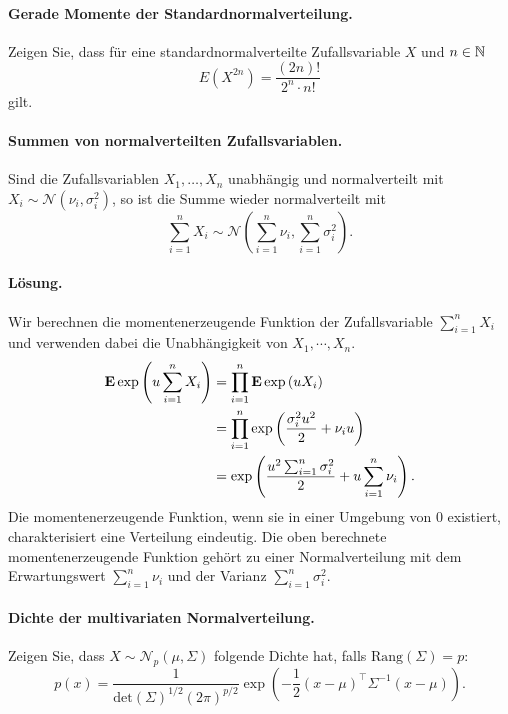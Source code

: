 \paragraph{Gerade Momente der Standardnormalverteilung. } Zeigen Sie, dass für eine
standardnormalverteilte Zufallsvariable $X$ und $n \in \mathbb N$
\begin{equation*}
    E\left( X^{2n} \right) = \frac{(2n)!}{2^n \cdot n!}
\end{equation*}
gilt. %

\paragraph{Summen von normalverteilten Zufallsvariablen. }
Sind die Zufallsvariablen $X_1,\ldots,X_n$ unabhängig und normalverteilt
mit $X_i \sim \mathcal N (\nu_i, \sigma_i^2)$, so ist die Summe
wieder normalverteilt mit 
\begin{equation*}
    \sum_{i=1}^{n} X_i \sim 
    \mathcal N \left( \sum_{i=1}^{n} \nu_i, \sum_{i=1}^{n} \sigma_i^2 \right). 
\end{equation*} %

\paragraph*{Lösung. }
Wir berechnen die momentenerzeugende Funktion der Zufallsvariable $\sum_{i=1}^{n} X_i$
und verwenden dabei die Unabhängigkeit von $X_1, \cdots, X_n$.
\begin{align*}
    \mathbf{E} \exp \left( u \sum_{i=1}^{n} X_i \right) 
    &= \prod_{i=1}^{n} \mathbf{E} \exp \left( u X_i \right) \\
    &= \prod_{i=1}^n \exp \left( \frac{\sigma_i^2 u^2 }{2} + \nu_i u \right) \\
    &= \exp \left( \frac{ u^2 \sum_{i=1}^{n} \sigma_i^2 }{2} + u \sum_{i=1}^{n} \nu_i \right).
\end{align*}
Die momentenerzeugende Funktion, wenn sie in einer Umgebung von $0$ existiert, 
charakterisiert eine Verteilung eindeutig. Die oben berechnete momentenerzeugende Funktion
gehört zu einer Normalverteilung mit dem Erwartungswert $\sum_{i=1}^{n} \nu_i$ und
der Varianz $\sum_{i=1}^{n} \sigma^2_i$. 


\paragraph{Dichte der multivariaten Normalverteilung. } Zeigen Sie, dass 
$X \sim \mathcal N_p\left( \mu, \Sigma \right) $ folgende Dichte hat, falls 
$\textrm{Rang}(\Sigma)=p$: 
\begin{equation*}
    p(x) = \frac{1}{ \textrm{det}(\Sigma)^{1/2} (2\pi)^{p/2}} \exp\left( - \frac{1}{2} (x  - \mu)^\top \Sigma^{-1} (x - \mu) \right).
\end{equation*} %

